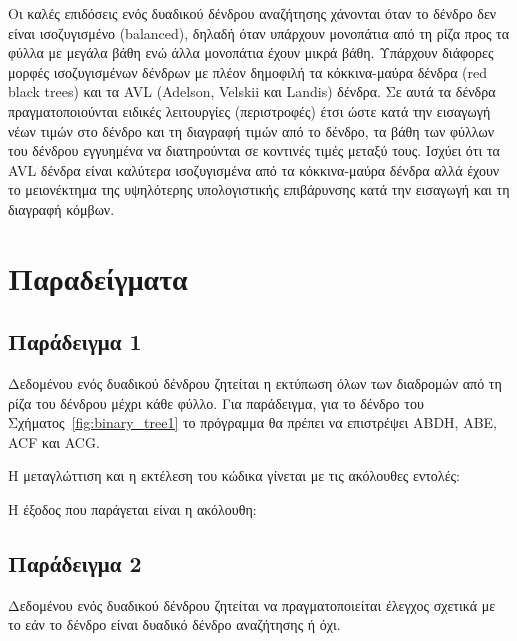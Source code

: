 Οι καλές επιδόσεις ενός δυαδικού δένδρου αναζήτησης χάνονται όταν το δένδρο δεν είναι ισοζυγισμένο (balanced), δηλαδή όταν υπάρχουν μονοπάτια από τη ρίζα προς τα φύλλα με μεγάλα βάθη ενώ άλλα μονοπάτια έχουν μικρά βάθη. Υπάρχουν διάφορες μορφές ισοζυγισμένων δένδρων με πλέον δημοφιλή τα κόκκινα-μαύρα δένδρα (red black trees) και τα AVL (Adelson, Velskii και Landis) δένδρα. Σε αυτά τα δένδρα πραγματοποιούνται ειδικές λειτουργίες (περιστροφές) έτσι ώστε κατά την εισαγωγή νέων τιμών στο δένδρο και τη διαγραφή τιμών από το δένδρο, τα βάθη των φύλλων του δένδρου εγγυημένα να διατηρούνται σε κοντινές τιμές μεταξύ τους. Ισχύει ότι τα AVL δένδρα είναι καλύτερα ισοζυγισμένα από τα κόκκινα-μαύρα δένδρα αλλά έχουν το μειονέκτημα της υψηλότερης υπολογιστικής επιβάρυνσης κατά την εισαγωγή και τη διαγραφή κόμβων.

\section{Παραδείγματα}

\subsection{Παράδειγμα 1}

Δεδομένου ενός δυαδικού δένδρου ζητείται η εκτύπωση όλων των διαδρομών από τη ρίζα του δένδρου μέχρι κάθε φύλλο. Για παράδειγμα, για το δένδρο του Σχήματος~\ref{fig:binary_tree1} το πρόγραμμα θα πρέπει να επιστρέψει ABDH, ABE, ACF και ACG.



Η μεταγλώττιση και η εκτέλεση του κώδικα γίνεται με τις ακόλουθες εντολές:



Η έξοδος που παράγεται είναι η ακόλουθη:




\subsection{Παράδειγμα 2}

Δεδομένου ενός δυαδικού δένδρου ζητείται να πραγματοποιείται έλεγχος σχετικά με το εάν το δένδρο είναι δυαδικό δένδρο αναζήτησης ή όχι. 



